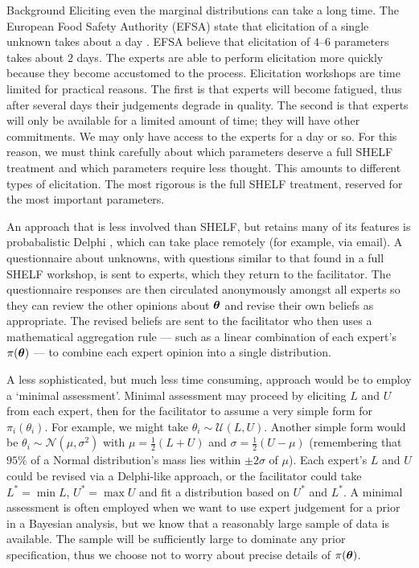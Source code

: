 \begin{chapter}{Background \label{Ch:background}}
Eliciting even the marginal distributions can take a long time. The European Food Safety Authority (EFSA) state that elicitation of a single unknown takes about a day \citep{EFSA2014}. EFSA believe that elicitation of $4$--$6$ parameters takes about $2$ days. The experts are able to perform elicitation more quickly because they become accustomed to the process. Elicitation workshops are time limited for practical reasons. The first is that experts will become fatigued, thus after several days their judgements degrade in quality. The second is that experts will only be available for a limited amount of time; they will have other commitments. We may only have access to the experts for a day or so. For this reason, we must think carefully about which parameters deserve a full SHELF treatment and which parameters require less thought. This amounts to different types of elicitation. The most rigorous is the full SHELF treatment, reserved for the most important parameters.

An approach that is less involved than SHELF, but retains many of its features is probabalistic Delphi \citep{Rowe1999}, which can take place remotely (for example, via email).  A questionnaire about unknowns, with questions similar to that found in a full SHELF workshop, is sent to experts, which they return to the facilitator. The questionnaire responses are then circulated anonymously amongst all experts so they can review the other opinions about $\bm{\theta}$ and revise their own beliefs as appropriate. The revised beliefs are sent to the facilitator who then uses a mathematical aggregation rule --- such as a linear combination of each expert's $\pi(\bm{\theta})$ --- to combine each expert opinion into a single distribution.

A less sophisticated, but much less time consuming, approach would be to employ a `minimal assessment'. Minimal assessment may proceed by eliciting $L$ and $U$ from each expert, then for the facilitator to assume a very simple form for $\pi_i(\theta_i)$. For example, we might take $\theta_i \sim \mathcal{U}(L, U)$. Another simple form would be $\theta_i \sim \mathcal{N}(\mu, \sigma^2)$  with $\mu = \frac{1}{2}(L+U)$ and $\sigma = \frac{1}{2}(U-\mu)$ (remembering that $95\%$ of a Normal distribution's mass lies within $\pm 2 \sigma$  of  $\mu$). Each expert's $L$ and $U$ could be revised via a Delphi-like approach, or the facilitator could take $L^{*} = \min{L}$, $U^{*} = \max{U}$ and fit a distribution based on $U^{*}$ and $L^{*}$. A minimal assessment is often employed when we want to use expert judgement for a prior in a Bayesian analysis, but we know that a reasonably large sample of data is available. The sample will be sufficiently large to dominate any prior specification, thus we choose not to worry about precise details of $\pi(\bm{\theta})$.


\end{chapter}
